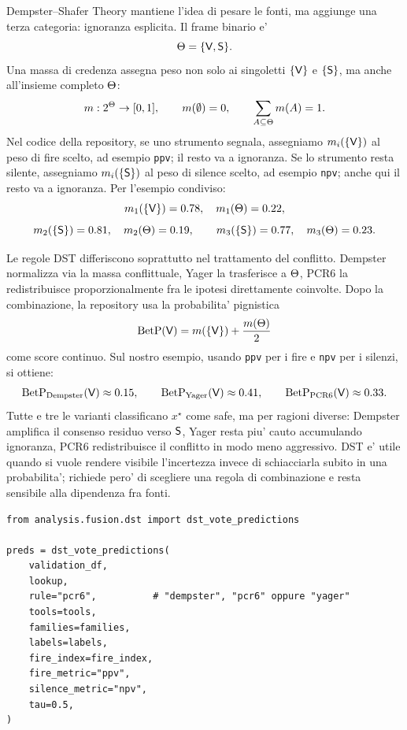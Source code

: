 Dempster--Shafer Theory mantiene l'idea di pesare le fonti, ma aggiunge una terza categoria: ignoranza esplicita. Il frame binario e'
\begin{equation}
\Theta=\{\mathsf{V},\mathsf{S}\}.
\end{equation}
Una massa di credenza assegna peso non solo ai singoletti $\{\mathsf{V}\}$ e $\{\mathsf{S}\}$, ma anche all'insieme completo $\Theta$:
\begin{equation}
m:2^{\Theta}\rightarrow[0,1],
\qquad
m(\emptyset)=0,
\qquad
\sum_{A\subseteq\Theta}m(A)=1.
\end{equation}
Nel codice della repository, se uno strumento segnala, assegniamo $m_i(\{\mathsf{V}\})$ al peso di fire scelto, ad esempio \texttt{ppv}; il resto va a ignoranza. Se lo strumento resta silente, assegniamo $m_i(\{\mathsf{S}\})$ al peso di silence scelto, ad esempio \texttt{npv}; anche qui il resto va a ignoranza. Per l'esempio condiviso:
\begin{equation}
m_1(\{\mathsf{V}\})=0.78,\quad m_1(\Theta)=0.22,
\end{equation}
\begin{equation}
m_2(\{\mathsf{S}\})=0.81,\quad m_2(\Theta)=0.19,
\qquad
m_3(\{\mathsf{S}\})=0.77,\quad m_3(\Theta)=0.23.
\end{equation}

Le regole DST differiscono soprattutto nel trattamento del conflitto. Dempster normalizza via la massa conflittuale, Yager la trasferisce a $\Theta$, PCR6 la redistribuisce proporzionalmente fra le ipotesi direttamente coinvolte. Dopo la combinazione, la repository usa la probabilita' pignistica
\begin{equation}
\mathrm{BetP}(\mathsf{V})=m(\{\mathsf{V}\})+\frac{m(\Theta)}{2}
\end{equation}
come score continuo. Sul nostro esempio, usando \texttt{ppv} per i fire e \texttt{npv} per i silenzi, si ottiene:
\begin{equation}
\mathrm{BetP}_{\mathrm{Dempster}}(\mathsf{V})\approx 0.15,\qquad
\mathrm{BetP}_{\mathrm{Yager}}(\mathsf{V})\approx 0.41,\qquad
\mathrm{BetP}_{\mathrm{PCR6}}(\mathsf{V})\approx 0.33.
\end{equation}
Tutte e tre le varianti classificano $x^\star$ come safe, ma per ragioni diverse: Dempster amplifica il consenso residuo verso $\mathsf{S}$, Yager resta piu' cauto accumulando ignoranza, PCR6 redistribuisce il conflitto in modo meno aggressivo. DST e' utile quando si vuole rendere visibile l'incertezza invece di schiacciarla subito in una probabilita'; richiede pero' di scegliere una regola di combinazione e resta sensibile alla dipendenza fra fonti.

\begin{lstlisting}[caption={Implementazione DST in analysis/fusion/dst.py}]
from analysis.fusion.dst import dst_vote_predictions

preds = dst_vote_predictions(
    validation_df,
    lookup,
    rule="pcr6",          # "dempster", "pcr6" oppure "yager"
    tools=tools,
    families=families,
    labels=labels,
    fire_index=fire_index,
    fire_metric="ppv",
    silence_metric="npv",
    tau=0.5,
)
\end{lstlisting}
